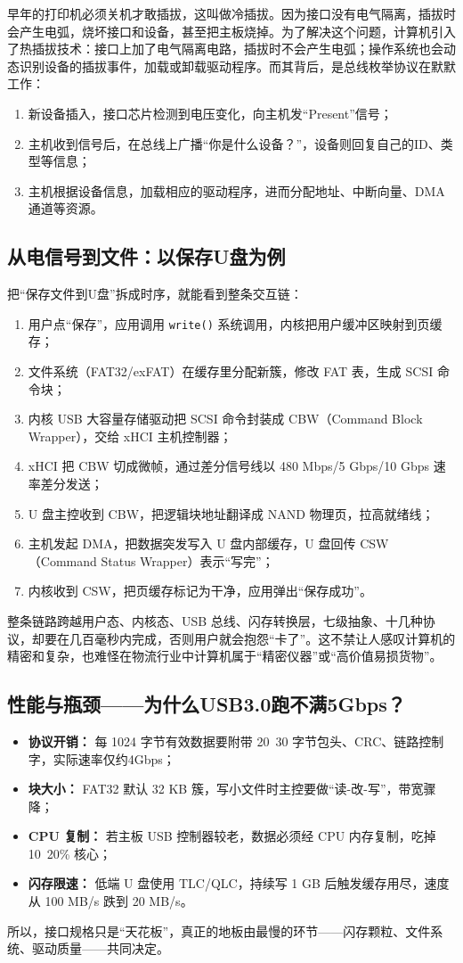 早年的打印机必须关机才敢插拔，这叫做冷插拔。因为接口没有电气隔离，插拔时会产生电弧，烧坏接口和设备，甚至把主板烧掉。为了解决这个问题，计算机引入了热插拔技术：接口上加了电气隔离电路，插拔时不会产生电弧；操作系统也会动态识别设备的插拔事件，加载或卸载驱动程序。而其背后，是总线枚举协议在默默工作：
\begin{enumerate}
  \item 新设备插入，接口芯片检测到电压变化，向主机发“Present”信号；
  \item 主机收到信号后，在总线上广播“你是什么设备？”，设备则回复自己的ID、类型等信息；
  \item 主机根据设备信息，加载相应的驱动程序，进而分配地址、中断向量、DMA通道等资源。
\end{enumerate}

\subsection{从电信号到文件：以保存U盘为例}

把“保存文件到U盘”拆成时序，就能看到整条交互链：
\begin{enumerate}
\item 用户点“保存”，应用调用  \texttt{write()}  系统调用，内核把用户缓冲区映射到页缓存；
\item 文件系统（FAT32/exFAT）在缓存里分配新簇，修改 FAT 表，生成 SCSI 命令块；
\item 内核 USB 大容量存储驱动把 SCSI 命令封装成 CBW（Command Block Wrapper），交给 xHCI 主机控制器；
\item xHCI 把 CBW 切成微帧，通过差分信号线以 480 Mbps/5 Gbps/10 Gbps 速率差分发送；
\item U 盘主控收到 CBW，把逻辑块地址翻译成 NAND 物理页，拉高就绪线；
\item 主机发起 DMA，把数据突发写入 U 盘内部缓存，U 盘回传 CSW（Command Status Wrapper）表示“写完”；
\item 内核收到 CSW，把页缓存标记为干净，应用弹出“保存成功”。
\end{enumerate}
整条链路跨越用户态、内核态、USB 总线、闪存转换层，七级抽象、十几种协议，却要在几百毫秒内完成，否则用户就会抱怨“卡了”。这不禁让人感叹计算机的精密和复杂，也难怪在物流行业中计算机属于“精密仪器”或“高价值易损货物”。

\subsection{性能与瓶颈——为什么USB3.0跑不满5Gbps？}
\begin{itemize}
\item \textbf{协议开销：} 每 1024 字节有效数据要附带 20~30 字节包头、CRC、链路控制字，实际速率仅约4Gbps；
\item \textbf{块大小：} FAT32 默认 32 KB 簇，写小文件时主控要做“读-改-写”，带宽骤降；
\item \textbf{CPU 复制：} 若主板 USB 控制器较老，数据必须经 CPU 内存复制，吃掉 10~20\% 核心；
\item \textbf{闪存限速：} 低端 U 盘使用 TLC/QLC，持续写 1 GB 后触发缓存用尽，速度从 100 MB/s 跌到 20 MB/s。
\end{itemize}
所以，接口规格只是“天花板”，真正的地板由最慢的环节——闪存颗粒、文件系统、驱动质量——共同决定。

